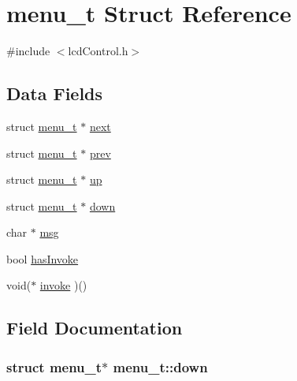 \hypertarget{structmenu__t}{}\section{menu\+\_\+t Struct Reference}
\label{structmenu__t}


{\ttfamily \#include $<$lcd\+Control.\+h$>$}

\subsection*{Data Fields}
\begin{DoxyCompactItemize}
\item 
struct \hyperlink{structmenu__t}{menu\+\_\+t} $\ast$ \hyperlink{structmenu__t_ac8c3484250d79851fc4a1d78e6bfe35e}{next}
\item 
struct \hyperlink{structmenu__t}{menu\+\_\+t} $\ast$ \hyperlink{structmenu__t_aa735a064d85ddc4550472eda861d3647}{prev}
\item 
struct \hyperlink{structmenu__t}{menu\+\_\+t} $\ast$ \hyperlink{structmenu__t_a607f9b5438465de6a26e0b480e892cc9}{up}
\item 
struct \hyperlink{structmenu__t}{menu\+\_\+t} $\ast$ \hyperlink{structmenu__t_a136767f98106b0e7569190bf3cddc4d8}{down}
\item 
char $\ast$ \hyperlink{structmenu__t_a41c914d5cf48adc4c811828b4543a3da}{msg}
\item 
bool \hyperlink{structmenu__t_a601f4454d1228e609ec0a1dfa89b116e}{has\+Invoke}
\item 
void($\ast$ \hyperlink{structmenu__t_a6ab085cf818612e72384c072ea04154f}{invoke} )()
\end{DoxyCompactItemize}


\subsection{Field Documentation}
\subsubsection[{\texorpdfstring{down}{down}}]{\setlength{\rightskip}{0pt plus 5cm}struct {\bf menu\+\_\+t}$\ast$ menu\+\_\+t\+::down}\hypertarget{structmenu__t_a136767f98106b0e7569190bf3cddc4d8}{}\label{structmenu__t_a136767f98106b0e7569190bf3cddc4d8}
